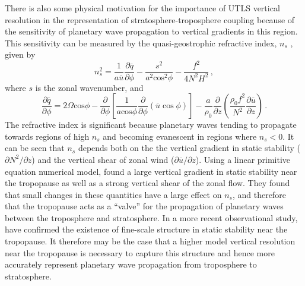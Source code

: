 There is also some physical motivation for the importance of UTLS vertical
resolution in the representation of stratosphere-troposphere coupling because of
the sensitivity of planetary wave propagation to vertical gradients in this
region. This sensitivity can be measured by the quasi-geostrophic refractive
index, $n_{s}$ \citep{Matsuno1970}, given by
\begin{equation}
  n_{s}^{2} = \frac{1}{a\overline{u}}\frac{\partial\overline{q}}{\partial\phi} -
  \frac{s^{2}}{a^{2}\mathrm{cos}^{2}\phi} - \frac{f^{2}}{4N^{2}H^{2}} \, ,
\label{eq:refractive_index}
\end{equation}
where $s$ is the zonal wavenumber, and
\begin{equation}
  \frac{\partial\overline{q}}{\partial\phi} = 2\Omega\mathrm{cos}\phi - \frac{\partial}{\partial\phi}\left[
    \frac{1}{a\mathrm{cos}\phi}\frac{\partial}{\partial\phi}(\overline{u}\cos\phi) \right] -
  \frac{a}{\rho_{0}}\frac{\partial}{\partial
    z}\left(\frac{\rho_{0}f^{2}}{N^{2}}\frac{\partial\overline{u}}{\partial z}\right)
  \, .
\end{equation}
The refractive index is significant because planetary waves tending to propagate
towards regions of high $n_{s}$ and becoming evanescent in regions where
$n_{s}<0$. It can be seen that $n_{s}$ depends both on the the vertical gradient
in static stability ($\partial N^2/\partial z$) and the vertical shear of zonal
wind ($\partial\overline{u}/\partial z$). Using a linear primitive equation
numerical model, \citet{Chen1992} found a large vertical gradient in static
stability near the tropopause as well as a strong vertical shear of the zonal
flow. They found that small changes in these quantities have a large effect on
$n_{s}$, and therefore that the tropopause acts as a ``valve'' for the
propagation of planetary waves between the troposphere and stratosphere. In a
more recent observational study, \citet{Grise2010} have confirmed the existence
of fine-scale structure in static stability near the tropopause. It therefore
may be the case that a higher model vertical resolution near the tropopause is
necessary to capture this structure and hence more accurately represent
planetary wave propagation from troposphere to stratosphere.



